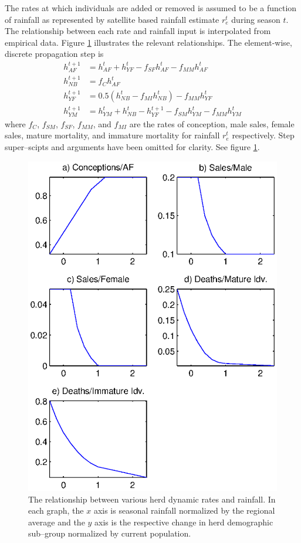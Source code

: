 \documentclass[letterpaper]{tufte-handout}
\begin{document}
The rates at which individuals are added or removed is assumed to be a function of rainfall as represented by satellite based rainfall estimate $r_e^t$ during season $t$. The relationship between each rate and rainfall input is interpolated from empirical data. Figure \ref{rferels} illustrates the relevant relationships. The element-wise, discrete propagation step is
\begin{align}
  h_{AF}^{t+1} &= h_{AF}^t + h_{YF}^t - f_{SF}h_{AF}^t - f_{MM}h_{AF}^t \\
  h_{NB}^{t+1} &= f_{C}h_{AF}^t \\
  h_{YF}^{t+1} &= 0.5(h_{NB}^t - f_{MI}h_{NB}^t) - f_{MM}h_{YF}^t \\
  h_{YM}^{t+1} &= h_{YM}^t + h_{NB}^t - h_{YF}^{t+1} - f_{SM}h_{YM}^t - f_{MM}h_{YM}^t
\end{align}
where $f_{C}$, $f_{SM}$, $f_{SF}$, $f_{MM}$, and $f_{MI}$ are the rates of conception, male sales, female sales, mature mortality, and immature mortality for rainfall $r^t_e$ respectively. Step super--scipts and arguments have been omitted for clarity.
See figure \ref{rferels}.

\begin{figure}
  \includegraphics[width=\textwidth]{refrel}
  \caption{The relationship between various herd dynamic rates and rainfall. In each graph, the $x$ axis is seasonal rainfall normalized by the regional average and the $y$ axis is the respective change in herd demographic sub--group normalized by current population.}
  \label{rferels}
\end{figure}
\end{document}
